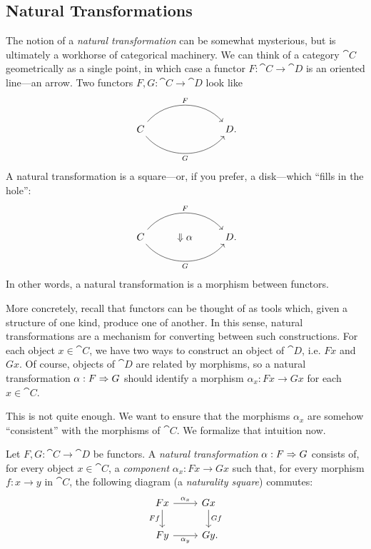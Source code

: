 
\subsection{Natural Transformations}

The notion of a \emph{natural transformation} can be somewhat mysterious, but is
ultimately a workhorse of categorical machinery. We can think of a category
$\cat{C}$ geometrically as a single point, in which case a functor $F:
\cat{C}\to\cat{D}$ is an oriented line---an arrow. Two functors $F,G:
\cat{C}\to\cat{D}$ look like \[
  \begin{tikzcd}
    C \ar[rr, "F", bend left=50]\ar[rr, "G"', bend right=50] & \phantom{\Downarrow\alpha} & D\punctuation{.}
  \end{tikzcd}
\]
A natural transformation is a square---or, if you prefer, a disk---which ``fills
in the hole'': \[
  \begin{tikzcd}
    C \ar[rr, "F", bend left=50]\ar[rr, "G"', bend right=50] & \Downarrow\alpha& D\punctuation{.}
  \end{tikzcd}
\]
In other words, a natural transformation is a morphism between functors.

More concretely, recall that functors can be thought of as tools which, given a
structure of one kind, produce one of another. In this sense, natural
transformations are a mechanism for converting between such constructions. For
each object $x\in\cat{C}$, we have two ways to construct an object of $\cat{D}$,
i.e. $Fx$ and $Gx$. Of course, objects of $\cat{D}$ are related by morphisms, so
a natural transformation $\alpha: F\Rightarrow G$ should identify a morphism $\alpha_x:
Fx\to Gx$ for each $x\in\cat{C}$.

This is not quite enough. We want to ensure that the morphisms $\alpha_x$ are
somehow ``consistent'' with the morphisms of $\cat{C}$. We formalize that
intuition now.

\begin{dfn}\label{def:natural transformation}
  Let $F, G: \cat{C}\to\cat{D}$ be functors. A \emph{natural transformation}
  $\alpha: F\Rightarrow G$ consists of, for every object $x\in\cat{C}$, a
  \emph{component} $\alpha_x: Fx\to Gx$ such that, for every morphism $f: x\to
  y$ in $\cat{C}$, the following diagram (a \emph{naturality square}) commutes:
  \[
    \begin{tikzcd}
      Fx\ar[r, "\alpha_x"]\ar[d, "Ff"'] & Gx\ar[d, "Gf"] \\
      Fy\ar[r, "\alpha_y"'] & Gy\punctuation{.}
    \end{tikzcd}
  \]
\end{dfn}

